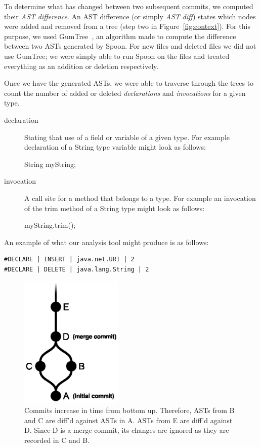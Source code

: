 \documentclass[conference]{IEEEtran}
\begin{document}
To determine what has changed between two subsequent commits, we computed their \emph{AST difference}. An AST difference (or simply \emph{AST diff}) states which nodes were added and removed from a tree (step two in Figure~\ref{fig:context}). For this purpose, we used GumTree~\cite{falleri:hal-01054552}, an algorithm made to compute the difference between two ASTs generated by Spoon. For new files and deleted files we did not use GumTree; we were simply able to run Spoon on the files and treated everything as an addition or deletion respectively.

Once we have the generated ASTs, we were able to traverse through the trees to count the number of added or deleted \emph{declarations} and \emph{invocations} for a given type. 

\begin{description}
\item [declaration] 
  Stating that use of a field or variable of a given type. For example declaration of a String type variable might look as follows:
  \\
  \begin{adjustwidth}{2.5em}{0pt}
  String myString; \\
  \end{adjustwidth}
\item [invocation] 
  A call site for a method that belongs to a type. For example an invocation of the trim method of a String type might look as follows:
  \\
  \begin{adjustwidth}{2.5em}{0pt}
  myString.trim(); \\
  \end{adjustwidth}
\end{description} 

An example of what our analysis tool might produce is as follows:

\begin{verbatim}
#DECLARE | INSERT | java.net.URI | 2
#DECLARE | DELETE | java.lang.String | 2
\end{verbatim}

\begin{figure}[!h]
\centering
\includegraphics[height=2.5in]{commits_view}
\caption{Commits increase in time from bottom up. Therefore, ASTs from B and C are diff’d against ASTs in A. ASTs from E are diff’d against D. Since D is a merge commit, its changes are ignored as they are recorded in C and B.}
\label{fig:commits}
\end{figure}
\end{document}
